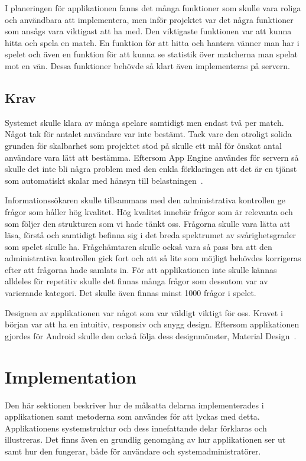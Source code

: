 \documentclass[a4paper, 11pt]{article}
\begin{document}
I planeringen för applikationen fanns det många funktioner som skulle vara roliga och användbara att implementera, men inför projektet var det några funktioner som ansågs vara viktigast att ha med. Den viktigaste funktionen var att kunna hitta och spela en match. En funktion för att hitta och hantera vänner man har i spelet och även en funktion för att kunna se statistik över matcherna man spelat mot en vän. Dessa funktioner behövde så klart även implementeras på servern.

\subsection{Krav}
Systemet skulle klara av många spelare samtidigt men endast två per match. Något tak för antalet användare var inte bestämt. Tack vare den otroligt solida grunden för skalbarhet som projektet stod på skulle ett mål för önskat antal användare vara lätt att bestämma. Eftersom App Engine användes för servern så skulle det inte bli några problem med den enkla förklaringen att det är en tjänst som automatiskt skalar med hänsyn till belastningen~\cite{appenginescalability}. 

Informationssökaren skulle tillsammans med den administrativa kontrollen ge frågor som håller hög kvalitet. Hög kvalitet innebär frågor som är relevanta och som följer den strukturen som vi hade tänkt oss. Frågorna skulle vara lätta att läsa, förstå och samtidigt befinna sig i det breda spektrumet av svårighetsgrader som spelet skulle ha. Frågehämtaren skulle också vara så pass bra att den administrativa kontrollen gick fort och att så lite som möjligt behövdes korrigeras efter att frågorna hade samlats in. För att applikationen inte skulle kännas alldeles för repetitiv skulle det finnas många frågor som dessutom var av varierande kategori. Det skulle även finnas minst 1000 frågor i spelet.

Designen av applikationen var något som var väldigt viktigt för oss. Kravet i början var att ha en intuitiv, responsiv och snygg design. Eftersom applikationen gjordes för Android skulle den också följa dess designmönster, Material Design~\cite{MaterialDesign}.

\section{Implementation}
Den här sektionen beskriver hur de målsatta delarna implementerades i applikationen samt metoderna som användes för att lyckas med detta. Applikationens systemstruktur och dess innefattande delar förklaras och illustreras. Det finns även en grundlig genomgång av hur applikationen ser ut samt hur den fungerar, både för användare och systemadministratörer.
\end{document}
